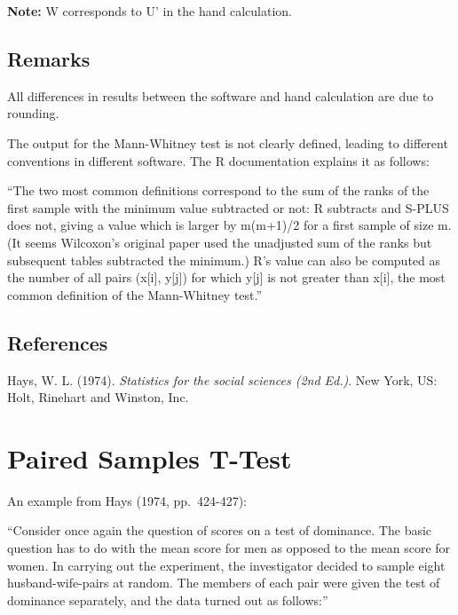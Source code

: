 \documentclass[
]{book}
\begin{document}
\textbf{Note:} W corresponds to U' in the hand calculation.

\hypertarget{remarks-1}{%
\subsection{Remarks}\label{remarks-1}}

All differences in results between the software and hand calculation are due to rounding.

The output for the Mann-Whitney test is not clearly defined, leading to different conventions in different software. The R documentation explains it as follows:

``The two most common definitions correspond to the sum of the ranks of the first sample with the minimum value subtracted or not: R subtracts and S-PLUS does not, giving a value which is larger by m(m+1)/2 for a first sample of size m. (It seems Wilcoxon's original paper used the unadjusted sum of the ranks but subsequent tables subtracted the minimum.) R's value can also be computed as the number of all pairs (x{[}i{]}, y{[}j{]}) for which y{[}j{]} is not greater than x{[}i{]}, the most common definition of the Mann-Whitney test.''

\hypertarget{references-1}{%
\subsection{References}\label{references-1}}

Hays, W. L. (1974). \emph{Statistics for the social sciences (2nd Ed.)}. New York, US: Holt, Rinehart and Winston, Inc.

\hypertarget{paired-samples-t-test}{%
\section{Paired Samples T-Test}\label{paired-samples-t-test}}

An example from Hays (1974, pp.~424-427):

``Consider once again the question of scores on a test of dominance. The basic question has to do with the mean score for men as opposed to the mean score for women. In carrying out the experiment, the investigator decided to sample eight husband-wife-pairs at random. The members of each pair were given the test of dominance separately, and the data turned out as follows:''
\end{document}
